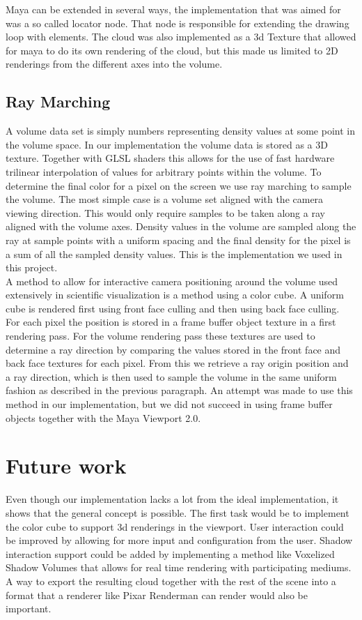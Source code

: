 \documentclass[11pt,twocolumn]{article}
\begin{document}
Maya can be extended in several ways, the implementation that was aimed for was a so called locator node.
That node is responsible for extending the drawing loop with elements.
The cloud was also implemented as a 3d Texture that allowed for maya to do its own rendering of the cloud, but this made us limited to 2D renderings from the different axes into the volume.

\subsection{Ray Marching}
A volume data set is simply numbers representing density values at some point in the volume space.
In our implementation the volume data is stored as a 3D texture.
Together with GLSL shaders this allows for the use of fast hardware trilinear interpolation of values for arbitrary points within the volume. To determine the final color for a pixel on the screen we use ray marching to sample the volume.
The most simple case is a volume set aligned with the camera viewing direction.
This would only require samples to be taken along a ray aligned with the volume axes.
Density values in the volume are sampled along the ray at sample points with a uniform spacing and the final density for the pixel is a sum of all the sampled density values.
This is the implementation we used in this project.
\\

A method to allow for interactive camera positioning around the volume used extensively in scientific visualization is a method using a color cube.
A uniform cube is rendered first using front face culling and then using back face culling.
For each pixel the position is stored in a frame buffer object texture in a first rendering pass.
For the volume rendering pass these textures are used to determine a ray direction by comparing the values stored in the front face and back face textures for each pixel. From this we retrieve a ray origin position and a ray direction, which is then used to sample the volume in the same uniform fashion as described in the previous paragraph. An attempt was made to use this method in our implementation, but we did not succeed in using frame buffer objects together with the Maya Viewport 2.0.

\section{Future work}
Even though our implementation lacks a lot from the ideal implementation, it shows that the general concept is possible.
The first task would be to implement the color cube to support 3d renderings in the viewport.
User interaction could be improved by allowing for more input and configuration from the user.
Shadow interaction support could be added by implementing a method like Voxelized Shadow Volumes that allows for real time rendering with participating mediums.
A way to export the resulting cloud together with the rest of the scene into a format that a renderer like Pixar Renderman can render would also be important.
\end{document}
